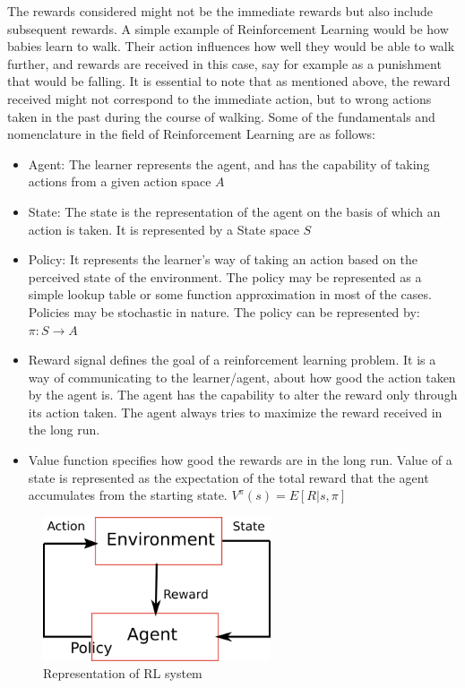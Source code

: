 \documentclass[hidelinks,BTech]{iitmdiss}
\begin{document}
The rewards considered might not be the immediate rewards but also include subsequent rewards. A simple example of Reinforcement Learning would be how babies learn to walk. Their action influences how well they would be able to walk further, and rewards are received in this case, say for example as a punishment that would be falling. It is essential to note that as mentioned above, the reward received might not correspond to the immediate action, but to wrong actions taken in the past during the course of walking. Some of the fundamentals and nomenclature in the field of Reinforcement Learning are as follows:
\begin{itemize}
\item{Agent: The learner represents the agent, and has the capability of taking actions from a given action space $A$}
\item{State: The state is the representation of the agent on the basis of which an action is taken. It is represented by a State space $S$}
\item{Policy: It represents the learner's way of taking an action based on the perceived state of the environment. The policy may be represented as a simple lookup table or some function approximation in most of the cases. Policies may be stochastic in nature.
The policy can be represented by: $\pi: S\rightarrow A$}

\item{Reward signal defines the goal of a reinforcement learning problem. It is a way of communicating to the learner/agent, about how good the action taken by the agent is. The agent has the capability to alter the reward only through its action taken. The agent always tries to maximize the reward received in the long run.}
\item{Value function specifies how good the rewards are in the long run. Value of a state is represented as the expectation of the total reward that the agent accumulates from the starting state.  $V^{\pi} (s) = E[R|s,\pi]$}
\end{itemize}

\begin{figure}[H]
  \centering
    \includegraphics[width=0.6\textwidth]{RL.png}
    \caption{Representation of RL system}
\end{figure}
\end{document}
